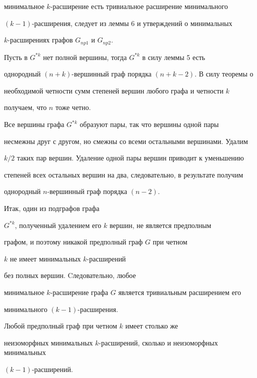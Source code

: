 минимальное $k$-расширение есть тривиальное расширение минимального


$(k-1)$-расширения, следует из леммы 6 и утверждений о минимальных


$k$-расширениях графов $G_{np1}$ и $G_{np2}$.





Пусть в $G^{*k}$ нет полной вершины, тогда $G^{*k}$ в силу леммы 5 есть


однородный $(n+k)$-вершинный граф порядка $(n+k-2)$. В силу теоремы о


необходимой четности сумм степеней вершин любого графа и четности $k$


получаем, что $n$ тоже четно.





Все вершины графа $G^{*k}$ образуют пары, так что вершины одной пары


несмежны друг с другом, но смежны со всеми остальными вершинами. Удалим


$k/2$ таких пар вершин. Удаление одной пары вершин приводит к уменьшению


степеней всех остальных вершин на два, следовательно, в результате получим


однородный $n$-вершинный граф порядка $(n-2)$.


Итак, один из подграфов графа


$G^{*k}$, полученный удалением его $k$ вершин, не является предполным


графом, и поэтому никакой предполный граф $G$ при четном


$k$ не имеет минимальных $k$-расширений 


без полных вершин. Cледовательно, любое


минимальное $k$-расширение графа $G$ является тривиальным расширением его


минимального $(k-1)$-расширения.





\begin{cornonum}


Любой предполный граф при четном $k$ имеет столько же


неизоморфных минимальных $k$-расширений, сколько и неизоморфных минимальных


$(k-1)$-расширений.


\end{cornonum}





